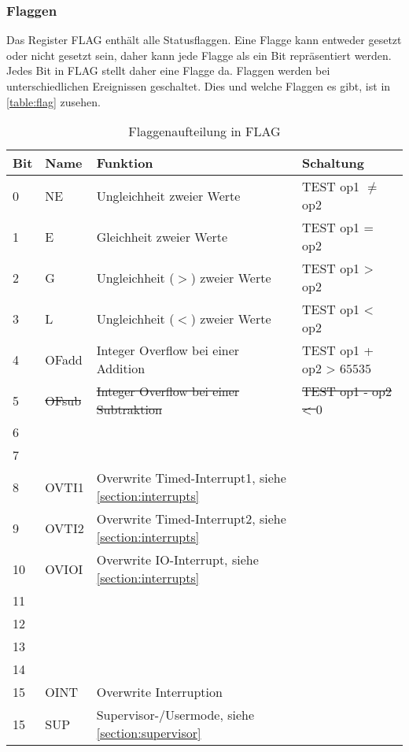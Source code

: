 \documentclass{scrartcl}
\begin{document}
\subsubsection{\label{section:flags}Flaggen}

Das Register FLAG enthält alle Statusflaggen.
Eine Flagge kann entweder gesetzt oder nicht gesetzt sein, daher kann jede Flagge als ein Bit repräsentiert werden.
Jedes Bit in FLAG stellt daher eine Flagge da. Flaggen werden bei unterschiedlichen Ereignissen geschaltet.
Dies und welche Flaggen es gibt, ist in \autoref{table:flag} zusehen.

\begin{center}
	\begin{table}[h]
		\caption{\label{table:flag}Flaggenaufteilung in FLAG}
		\begin{tabular}{l | l | l | l}
			Bit & Name & Funktion & Schaltung \\
			\hline
			 0 & NE    & Ungleichheit zweier Werte					& TEST op1 $\neq$ op2\\
			 1 & E     & Gleichheit zweier Werte 					& TEST op1 = op2\\
			 2 & G     & Ungleichheit ($>$) zweier Werte 			& TEST op1 > op2\\
			 3 & L     & Ungleichheit ($<$) zweier Werte 			& TEST op1 < op2\\
			 4 & OFadd & Integer Overflow bei einer Addition 		& TEST op1 + op2 > $65535$ \\
			 5 & \sout{OFsub} & \sout{Integer Overflow bei einer Subtraktion} 	& \sout{TEST op1 - op2 < $0$} \\
			 6 &  &  & \\
			 7 &  &  & \\
			 8 & OVTI1 & Overwrite Timed-Interrupt1, siehe \autoref{section:interrupts} &  \\
			 9 & OVTI2 & Overwrite Timed-Interrupt2, siehe \autoref{section:interrupts} &  \\
			10 & OVIOI & Overwrite IO-Interrupt, siehe \autoref{section:interrupts} &  \\
			11 &  &  &  \\
			12 &  &  &  \\
			13 &  &  &  \\
			14 &  &  &  \\
			15 & OINT & Overwrite Interruption &  \\
			15 & SUP & Supervisor-/Usermode, siehe \autoref{section:supervisor} & 
		\end{tabular}
	\end{table}
\end{center}
\end{document}
